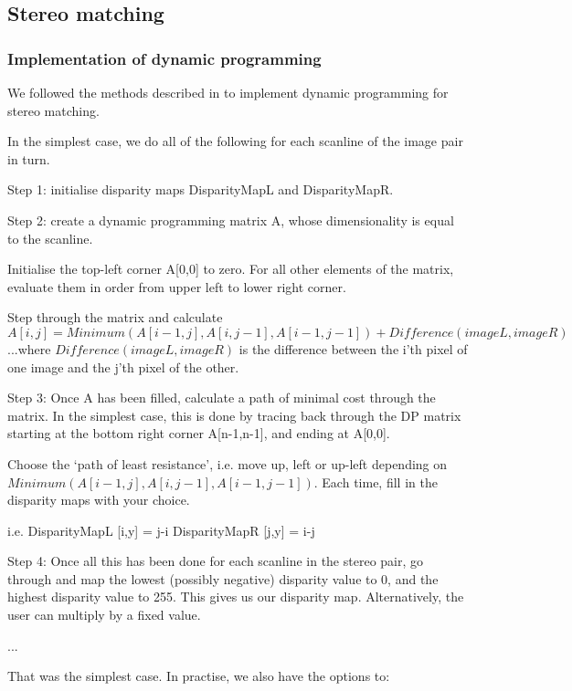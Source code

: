
\subsection{Stereo matching}
\label{sec:stereo}

\subsubsection{Implementation of dynamic programming}

We followed the methods described in \cite{realtimestereo} to implement dynamic programming for stereo matching.

In the simplest case, we do all of the following for each scanline of the image pair in turn.

Step 1: initialise disparity maps DisparityMapL and DisparityMapR.

Step 2: create a dynamic programming matrix A, whose dimensionality is equal to the scanline.

Initialise the top-left corner A[0,0] to zero. For all other elements of the matrix, evaluate them in order from upper left to lower right corner.

Step through the matrix and calculate
\[
A[i,j] = Minimum(A[i-1,j], A[i,j-1], A[i-1,j-1])  +  Difference(imageL, imageR)
\]
...where $Difference(imageL, imageR)$ is the difference between the i'th pixel of one image and the j'th pixel of the other.

Step 3: Once A has been filled, calculate a path of minimal cost through the matrix. In the simplest case, this is done by tracing back through the DP matrix starting at the bottom right corner A[n-1,n-1], and ending at A[0,0].

Choose the `path of least resistance', i.e. move up, left or up-left depending on $Minimum(A[i-1,j], A[i,j-1], A[i-1,j-1])$. Each time, fill in the disparity maps with your choice.

i.e.
DisparityMapL [i,y] = j-i
DisparityMapR [j,y] = i-j

Step 4: Once all this has been done for each scanline in the stereo pair, go through and map the lowest (possibly negative) disparity value to 0, and the highest disparity value to 255. This gives us our disparity map. Alternatively, the user can multiply by a fixed value.

...

That was the simplest case. In practise, we also have the options to:

